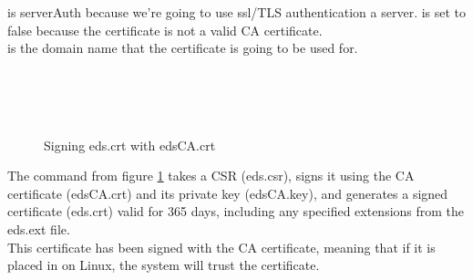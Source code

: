  is serverAuth because we're going to use ssl/TLS authentication a server.
 is set to false because the certificate is not a valid  CA certificate.\\
 is the domain name that the certificate is going to be used for.\\\cite{openssl-ext}
\begin{figure}[h]
    \begin{center}
         \\
         \\
         \\
    \end{center}
    \caption{Signing eds.crt with edsCA.crt}
    \label{fig:sign-cert}
\end{figure}

The command from figure \ref{fig:sign-cert} takes a CSR (eds.csr), signs it using the CA certificate 
(edsCA.crt) and its private key (edsCA.key), and generates a signed certificate 
(eds.crt) valid for 365 days, including any specified extensions from the eds.ext file.\\
This certificate has been signed with the CA certificate, 
meaning that if it is placed in  on Linux, the system will trust the certificate.